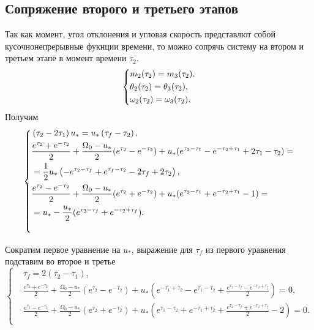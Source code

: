 \documentclass[a4paper,12pt, openany]{book}
\theoremstyle{plain} %
\theoremstyle{definition} %
\theoremstyle{remark} %
\numberwithin{equation}{chapter}
\begin{document}
{\subsection{Сопряжение второго и третьего этапов}

Так как момент, угол отклонения и угловая скорость представлют собой кусочнонепрерывные фукнции времени,
то можно сопрячь систему на втором и третьем этапе в момент времени $\tau_2$.
\[
    \left\{ {\begin{aligned}
                 & m_2(\tau_2) = m_3(\tau_2), \hfill            \\
                 & \theta_2(\tau_2) =  \theta_3(\tau_2), \hfill \\
                 & \omega_2(\tau_2) = \omega_3(\tau_2) . \hfill \\
            \end{aligned}} \right.
\]
Получим
\[
    \left\{
    \begin{multlined}
        \left(\tau _2-2 \tau _1\right) u_*=u_* \left(\tau _f-\tau _2\right), \\
        \shoveleft{\frac{e^{\tau_2}+e^{-\tau_2}}{2}+\frac{\Omega_0-u_\ast}{2}(e^{\tau_2}-e^{-\tau_2})+u_*(e^{\tau_2-\tau_1}-e^{-\tau_2+\tau_1}+2\tau_1-\tau_2)=} \\
        \shoveleft{=\frac{1}{2} u_* \left(-e^{\tau _2-\tau _f}+e^{\tau _f-\tau _2}-2 \tau _f+2
            \tau _2\right),} \\
        \shoveleft{\frac{e^{\tau_2}-e^{-\tau_2}}{2}+\frac{\Omega_0-u_\ast}{2}(e^{\tau_2}+e^{-\tau_2})+u_*(e^{\tau_2-\tau_1}+e^{-\tau_2+\tau_1}-1)=} \\
        \shoveleft{=u_*-\frac{u_*}{2}(e^{\tau_2-\tau_f}+e^{-\tau_2+\tau_f}).} \\
    \end{multlined}
    \right.
\]

Сократим первое уравнение на $u_*$, выражение для $\tau_f$ из первого уравнения подставим во второе и третье
\begin{equation}\label{fullconnected}
    \left\{ {\begin{aligned}
                 & \tau_f=2(\tau_2-\tau_1),                                                                                                                                                                 \\
                 & \frac{e^{\tau_2}+e^{-\tau_2}}{2}+\frac{\Omega_0-u_*}{2}(e^{\tau_2}-e^{-\tau_2})+u_*\left(e^{-\tau_1+\tau_2}-e^{\tau_1-\tau_2}+\frac{e^{\tau_2-\tau_f}-e^{-\tau_2+\tau_f}}{2}\right)=0,   \\
                 & \frac{e^{\tau_2}-e^{-\tau_2}}{2}+\frac{\Omega_0-u_*}{2}(e^{\tau_2}+e^{-\tau_2})+u_*\left(e^{\tau_1-\tau_2}+e^{-\tau_1+\tau_2}+\frac{e^{\tau_2-\tau_f}+e^{-\tau_2+\tau_f}}{2}-2\right)=0. \\
            \end{aligned}} \right.
\end{equation}

}
\end{document}
